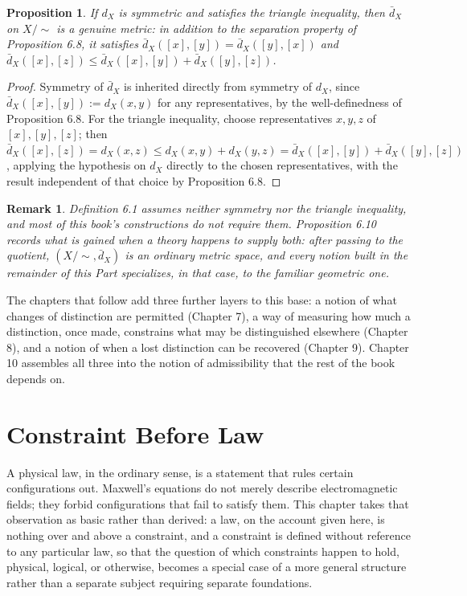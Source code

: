 \documentclass[11pt]{book}
\newtheorem{proposition}[theorem]{Proposition}
\newtheorem{remark}[theorem]{Remark}
\begin{document}
\begin{proposition}
If $d_X$ is symmetric and satisfies the triangle inequality, then $\bar d_X$ on $X/\!\sim$ is a genuine metric: in addition to the separation property of Proposition 6.8, it satisfies $\bar d_X([x],[y]) = \bar d_X([y],[x])$ and $\bar d_X([x],[z]) \leq \bar d_X([x],[y]) + \bar d_X([y],[z])$.
\end{proposition}

\begin{proof}
Symmetry of $\bar d_X$ is inherited directly from symmetry of $d_X$, since $\bar d_X([x],[y]) := d_X(x,y)$ for any representatives, by the well-definedness of Proposition 6.8. For the triangle inequality, choose representatives $x,y,z$ of $[x],[y],[z]$; then $\bar d_X([x],[z]) = d_X(x,z) \leq d_X(x,y) + d_X(y,z) = \bar d_X([x],[y]) + \bar d_X([y],[z])$, applying the hypothesis on $d_X$ directly to the chosen representatives, with the result independent of that choice by Proposition 6.8.
\end{proof}

\begin{remark}
Definition 6.1 assumes neither symmetry nor the triangle inequality, and most of this book's constructions do not require them. Proposition 6.10 records what is gained when a theory happens to supply both: after passing to the quotient, $(X/\!\sim, \bar d_X)$ is an ordinary metric space, and every notion built in the remainder of this Part specializes, in that case, to the familiar geometric one.
\end{remark}

The chapters that follow add three further layers to this base: a notion of what changes of distinction are permitted (Chapter 7), a way of measuring how much a distinction, once made, constrains what may be distinguished elsewhere (Chapter 8), and a notion of when a lost distinction can be recovered (Chapter 9). Chapter 10 assembles all three into the notion of admissibility that the rest of the book depends on.

\chapter{Constraint Before Law}

A physical law, in the ordinary sense, is a statement that rules certain configurations out. Maxwell's equations do not merely describe electromagnetic fields; they forbid configurations that fail to satisfy them. This chapter takes that observation as basic rather than derived: a law, on the account given here, is nothing over and above a constraint, and a constraint is defined without reference to any particular law, so that the question of which constraints happen to hold, physical, logical, or otherwise, becomes a special case of a more general structure rather than a separate subject requiring separate foundations.
\end{document}
